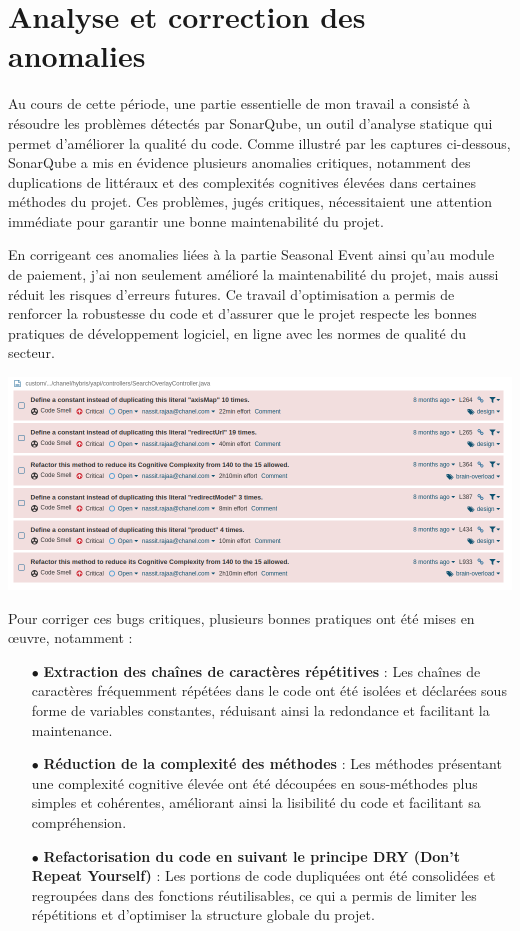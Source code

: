 \section{Analyse et correction des anomalies}

Au cours de cette période, une partie essentielle de mon travail a consisté à résoudre les problèmes détectés par SonarQube, un outil d'analyse statique qui permet d'améliorer la qualité du code. Comme illustré par les captures ci-dessous, SonarQube a mis en évidence plusieurs anomalies critiques, notamment des  duplications de littéraux  et des  complexités cognitives  élevées dans certaines méthodes du projet. Ces problèmes, jugés critiques, nécessitaient une attention immédiate pour garantir une bonne maintenabilité du projet.

En corrigeant ces anomalies liées à la partie Seasonal Event ainsi qu'au module de paiement, j'ai non seulement amélioré la maintenabilité du projet, mais aussi réduit les risques d'erreurs futures. Ce travail d'optimisation a permis de renforcer la  robustesse  du code et d'assurer que le projet respecte les bonnes pratiques de développement logiciel, en ligne avec les normes de qualité du secteur.
\begin{center}
    \centering
    \includegraphics[width=19cm]{Figures/Screens/bug.png}
    \label{fig:corr}
\end{center}
Pour corriger ces bugs critiques, plusieurs bonnes pratiques ont été mises en œuvre, notamment :

\begin{itemize}
    \item[$\bullet$] \textbf{Extraction des chaînes de caractères répétitives} : Les chaînes de caractères fréquemment répétées dans le code ont été isolées et déclarées sous forme de variables constantes, réduisant ainsi la redondance et facilitant la maintenance.
    \item[$\bullet$] \textbf{Réduction de la complexité des méthodes} : Les méthodes présentant une complexité cognitive élevée ont été découpées en sous-méthodes plus simples et cohérentes, améliorant ainsi la lisibilité du code et facilitant sa compréhension.
    \item[$\bullet$] \textbf{Refactorisation du code en suivant le principe DRY (Don't Repeat Yourself)} : Les portions de code dupliquées ont été consolidées et regroupées dans des fonctions réutilisables, ce qui a permis de limiter les répétitions et d'optimiser la structure globale du projet.
\end{itemize}

